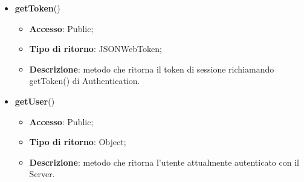 {{{\begin{itemize}
				\begin{itemize}
					\item \textbf{Accesso}: Public;
					\item \textbf{Tipo di ritorno}: Void;
					\item \textbf{Descrizione}: metodo che, attraverso l'oggetto formData contenente le credenziali di accesso e la nuova password, effettua il cambio della password di un utente richiamando il metodo changepassword() di Authentication. Se l'operazione ha successo viene invocato success altrimenti error.
				\end{itemize}
				\item \textbf{getToken}()
				\begin{itemize}
					\item \textbf{Accesso}: Public;
					\item \textbf{Tipo di ritorno}: JSONWebToken;
					\item \textbf{Descrizione}: metodo che ritorna il token di sessione richiamando getToken() di Authentication.
				\end{itemize}
				\item \textbf{getUser}()
				\begin{itemize}
					\item \textbf{Accesso}: Public;
					\item \textbf{Tipo di ritorno}: Object;
					\item \textbf{Descrizione}: metodo che ritorna l'utente attualmente autenticato con il Server.
				\end{itemize}
			\end{itemize} 
		}
}}
